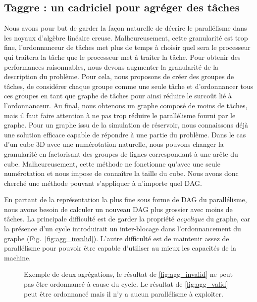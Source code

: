 \subsection{Taggre : un cadriciel pour agréger des tâches}
Nous avons pour but de garder la façon naturelle de décrire le parallélisme dans les noyaux d'algèbre linéaire creuse.
%
Malheureusement, cette granularité est trop fine, l'ordonnanceur de tâches met plus de temps à choisir quel sera le processeur qui traitera la tâche que le processeur met à traiter la tâche.
%
Pour obtenir des performances raisonnables, nous devons augmenter la granularité de la description du problème.
%
Pour cela, nous proposons de créer des groupes de tâches, de considérer chaque groupe comme une seule tâche et d'ordonnancer tous ces groupes en tant que graphe de tâches pour ainsi réduire le surcoût lié à l'ordonnanceur.
%
Au final, nous obtenons un graphe composé de moins de tâches, mais il faut faire attention à ne pas trop réduire le parallélisme fourni par le graphe.
%
Pour un graphe issu de la simulation de réservoir, nous connaissons déjà une solution efficace capable de répondre à une partie du problème.
%
Dans le cas d'un cube 3D avec une numérotation naturelle, nous pouvons changer la granularité en factorisant des groupes de lignes correspondant à une arête du cube.
%
Malheureusement, cette méthode ne fonctionne qu'avec une seule numérotation et nous impose de connaître la taille du cube.
%
Nous avons donc cherché une méthode pouvant s'appliquer à n'importe quel DAG.



En partant de la représentation la plus fine sous forme de DAG du parallélisme, nous avons besoin de calculer un nouveau DAG plus grossier avec moins de tâches.
%
La principale difficulté est de garder la propriété {\em acyclique} du graphe, car la présence d'un cycle introduirait un inter-blocage dans l'ordonnancement du graphe (Fig.~\ref{fig:agg_invalid}).
%
L'autre difficulté est de maintenir assez de parallélisme pour pouvoir être capable d'utiliser au mieux les capacités de la machine.

\begin{figure}[!h]
     \begin{center}
        \hspace{0.15\textwidth}%
    \end{center}
    \caption{Exemple de deux agrégations, le résultat de \ref{fig:agg_invalid} ne peut pas être ordonnancé à cause du cycle. Le résultat de \ref{fig:agg_valid} peut être ordonnancé mais il n'y a aucun parallélisme à exploiter.}
    \label{fig:agg_basic}
\end{figure}

